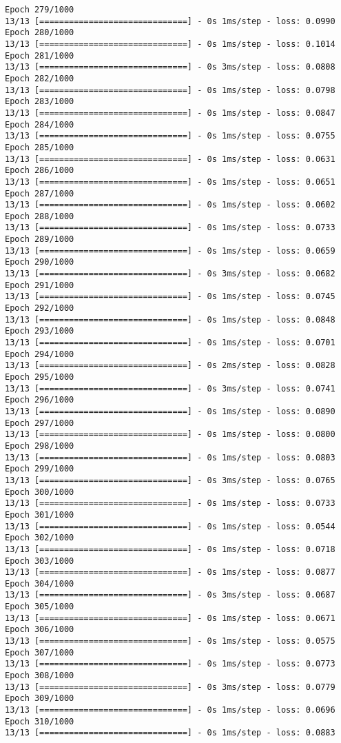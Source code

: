 \documentclass[11pt]{article}
\begin{document}
\begin{Verbatim}[commandchars=\\\{\}]
Epoch 279/1000
13/13 [==============================] - 0s 1ms/step - loss: 0.0990
Epoch 280/1000
13/13 [==============================] - 0s 1ms/step - loss: 0.1014
Epoch 281/1000
13/13 [==============================] - 0s 3ms/step - loss: 0.0808
Epoch 282/1000
13/13 [==============================] - 0s 1ms/step - loss: 0.0798
Epoch 283/1000
13/13 [==============================] - 0s 1ms/step - loss: 0.0847
Epoch 284/1000
13/13 [==============================] - 0s 1ms/step - loss: 0.0755
Epoch 285/1000
13/13 [==============================] - 0s 1ms/step - loss: 0.0631
Epoch 286/1000
13/13 [==============================] - 0s 1ms/step - loss: 0.0651
Epoch 287/1000
13/13 [==============================] - 0s 1ms/step - loss: 0.0602
Epoch 288/1000
13/13 [==============================] - 0s 1ms/step - loss: 0.0733
Epoch 289/1000
13/13 [==============================] - 0s 1ms/step - loss: 0.0659
Epoch 290/1000
13/13 [==============================] - 0s 3ms/step - loss: 0.0682
Epoch 291/1000
13/13 [==============================] - 0s 1ms/step - loss: 0.0745
Epoch 292/1000
13/13 [==============================] - 0s 1ms/step - loss: 0.0848
Epoch 293/1000
13/13 [==============================] - 0s 1ms/step - loss: 0.0701
Epoch 294/1000
13/13 [==============================] - 0s 2ms/step - loss: 0.0828
Epoch 295/1000
13/13 [==============================] - 0s 3ms/step - loss: 0.0741
Epoch 296/1000
13/13 [==============================] - 0s 1ms/step - loss: 0.0890
Epoch 297/1000
13/13 [==============================] - 0s 1ms/step - loss: 0.0800
Epoch 298/1000
13/13 [==============================] - 0s 1ms/step - loss: 0.0803
Epoch 299/1000
13/13 [==============================] - 0s 3ms/step - loss: 0.0765
Epoch 300/1000
13/13 [==============================] - 0s 1ms/step - loss: 0.0733
Epoch 301/1000
13/13 [==============================] - 0s 1ms/step - loss: 0.0544
Epoch 302/1000
13/13 [==============================] - 0s 1ms/step - loss: 0.0718
Epoch 303/1000
13/13 [==============================] - 0s 1ms/step - loss: 0.0877
Epoch 304/1000
13/13 [==============================] - 0s 3ms/step - loss: 0.0687
Epoch 305/1000
13/13 [==============================] - 0s 1ms/step - loss: 0.0671
Epoch 306/1000
13/13 [==============================] - 0s 1ms/step - loss: 0.0575
Epoch 307/1000
13/13 [==============================] - 0s 1ms/step - loss: 0.0773
Epoch 308/1000
13/13 [==============================] - 0s 3ms/step - loss: 0.0779
Epoch 309/1000
13/13 [==============================] - 0s 1ms/step - loss: 0.0696
Epoch 310/1000
13/13 [==============================] - 0s 1ms/step - loss: 0.0883

\end{Verbatim}
\end{document}
